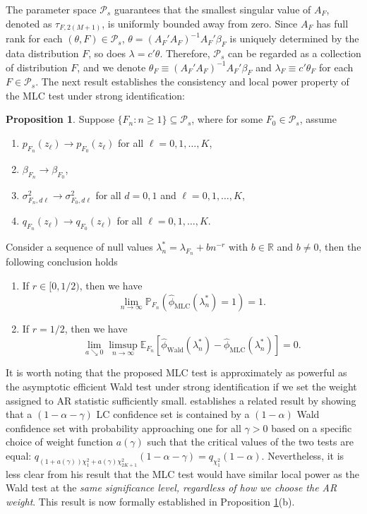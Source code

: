 \documentclass[11pt]{article}
\theoremstyle{definition}
\newtheorem{proposition}{Proposition}[section]
\newcommand{\R}{\ensuremath{\mathbb{R}}}
\newcommand{\Exp}{\ensuremath{\mathbb{E}}} %
\newcommand{\Prob}{\ensuremath{\mathbb{P}}} %
\newcommand{\0}{\ensuremath{\mathbf{0}}}
\begin{document}
\begin{bibunit}
The parameter space $\mathcal{P}_s$ guarantees that the smallest singular value of $A_F$, denoted as $\tau_{F,2(M+1)}$, is uniformly bounded away from zero. Since $A_F$ has full rank for each $(\theta,F)\in\mathcal{P}_s$, $\theta = (A_F'A_{F})^{-1}A_{F}'\beta_F$ is uniquely determined by the data distribution $F$, so does $\lambda = c'\theta$. Therefore, $\mathcal{P}_s$ can be regarded as a collection of distribution $F$, and we denote $\theta_F \equiv (A_F'A_{F})^{-1}A_{F}'\beta_F$ and $\lambda_F \equiv c'\theta_F$ for each $F \in \mathcal{P}_s$. The next result establishes the consistency and local power property of the MLC test under strong identification:
\begin{proposition}
\label{prop:local_power_MLC}
Suppose $\{F_n: n \geq 1\} \subseteq \mathcal{P}_s$, where for some $F_0 \in \mathcal{P}_s$, assume 
\begin{enumerate}
    \item $p_{F_n}(z_\ell) \to p_{F_0}(z_\ell)$ for all $\ell = 0,1,\ldots,K$,
    \item $\beta_{F_n} \to \beta_{F_0}$,
    \item $\sigma^2_{F_n,d\ell} \to \sigma^2_{F_0,d\ell}$ for all $d = 0,1$ and $\ell = 0,1,\ldots,K$,
    \item $q_{F_n}(z_\ell) \to q_{F_0}(z_\ell)$ for all $\ell = 0,1,\ldots,K$.
\end{enumerate}
Consider a sequence of null values $\lambda_n^* = \lambda_{F_n} + bn^{-r}$ with $b \in \R$ and $b \neq 0$, then the following conclusion holds
\begin{enumerate}
    \item[(a)] If $r \in [0,1/2)$, then we have 
    \begin{equation}
    \label{eq:MLC_consistency}
        \lim_{n\to\infty} \Prob_{F_n}(\hat{\phi}_{\text{MLC}}(\lambda_n^*) = 1) = 1.
    \end{equation}
    \item[(b)] If $r = 1/2$, then we have
    \[
        \lim_{a\searrow 0}\limsup_{n\to\infty}\Exp_{F_n}\left[\hat{\phi}_{\text{Wald}}(\lambda_n^*) - \hat{\phi}_{\text{MLC}}(\lambda_n^*)\right] = 0.
    \]
\end{enumerate}
\end{proposition}

It is worth noting that the proposed MLC test is approximately as powerful as the asymptotic efficient Wald test under strong identification if we set the weight assigned to AR statistic sufficiently small. \citet[Theorem 3]{andrews.i:2018} establishes a related result by showing that a $(1-\alpha-\gamma)$ LC confidence set is contained by a $(1-\alpha)$ Wald confidence set with probability approaching one for all $\gamma > 0$ based on a specific choice of weight function $a(\gamma)$ such that the critical values of the two tests are equal:  $q_{(1+a(\gamma))\chi_1^2 + a(\gamma)\chi_{2K+1}^2}(1-\alpha-\gamma) = q_{\chi_1^2}(1-\alpha)$. Nevertheless, it is less clear from his result that the MLC test would have similar local power as the Wald test at the \textit{same significance level, regardless of how we choose the AR weight}. This result is now formally established in Proposition \ref{prop:local_power_MLC}(b).


\end{bibunit}
\end{document}
